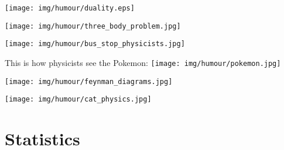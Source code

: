 	\begin{center}\underline{\hspace{5 cm}}\end{center}

	\begin{center}
	\texttt{[image: img/humour/duality.eps]}
	\end{center}
	
	\begin{center}\underline{\hspace{5 cm}}\end{center}
	
	\begin{center}
	\texttt{[image: img/humour/three\_body\_problem.jpg]}
	\end{center}
	
	\begin{center}\underline{\hspace{5 cm}}\end{center}
	
	\begin{center}
	\texttt{[image: img/humour/bus\_stop\_physicists.jpg]}
	\end{center}
	
	\begin{center}\underline{\hspace{5 cm}}\end{center}
	
	\begin{center}
		This is how physicists see the Pokemon:
		\texttt{[image: img/humour/pokemon.jpg]}
	\end{center}
	
	\begin{center}
	\texttt{[image: img/humour/feynman\_diagrams.jpg]}
	\end{center}
	
	\begin{center}\underline{\hspace{5 cm}}\end{center}
	
	\begin{center}
	\texttt{[image: img/humour/cat\_physics.jpg]}
	\end{center}
	

	\pagebreak
	\section{Statistics}

